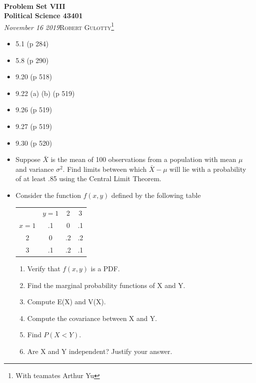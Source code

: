 \documentclass[12pt]{article}
\begin{document}
{\noindent\Huge\bf  \\[0.5\baselineskip] {\selectfont  Problem Set VIII}         }\\[2\baselineskip] %
{ {\bf {}\selectfont Political Science 43401}\\ {\textit{\selectfont     November 16 2019}}}\hfill   {\large \textsc{Robert Gulotty}\footnote{With teamates Arthur Yu}} %
\\[1.4\baselineskip] 





\begin{itemize}
\item  5.1 (p 284)

\item 5.8 (p 290)

\item 9.20 (p 518)

\item 9.22 (a) (b) (p 519)

\item 9.26 (p 519)
\item 9.27 (p 519)
\item 9.30 (p 520)

\item Suppose $\bar{X}$ is the mean of 100 observations from a population
  with mean $\mu$ and variance $\sigma^2$.  Find limits between which
  $\bar X - \mu$ will lie with a probability of at least .85 using the Central Limit Theorem.
  
\item Consider the function $f(x,y)$ defined by the following table

\begin{tabular}{cccc}
&$y=1$ &2&3\\
$x=1$ &.1&0&.1\\
2& 0 &.2& .2\\
3 & .1&.2&.1
\end{tabular}

\begin{enumerate}
\item Verify that $f(x,y)$ is a PDF.
\item Find the marginal probability functions of X and Y.
\item Compute E(X) and V(X).
\item Compute the covariance between X and Y. 
\item Find $P(X<Y)$.
\item Are X and Y independent? Justify your answer.
\end{enumerate}
\end{itemize}

 
\end{document}
